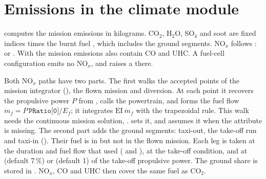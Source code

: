\documentclass[a4paper,11pt]{article}
\newcommand{\EI}[1]{\mathrm{EI}_{\mathrm{#1}}}
\begin{document}
\section{Emissions in the climate module}\label{sec:em-climate}

 computes the mission emissions in kilograms.
CO$_2$, H$_2$O, SO$_4$ and soot are fixed indices times the burnt fuel , which
includes the ground segments. NO$_x$ follows :
 or . With  the mission emissions also
contain CO and UHC. A fuel-cell configuration emits no NO$_x$, and  raises a
 there.

Both NO$_x$ paths have two parts. The first walks the accepted points of the mission integrator
(), the flown mission and diversion. At each point it recovers the
propulsive power $P$ from , calls the powertrain, and forms the fuel flow
$\dot m_f = P\,\texttt{PRatio[0]}/E_f$; it integrates $\EI{}\,\dot m_f$ with the trapezoidal
rule. This walk needs the continuous mission solution, .
 sets it, and  assumes it when the attribute is
missing. The second part adds the ground segments: taxi-out, the take-off run and taxi-in
(). Their fuel is in  but not in the flown
mission. Each leg is taken at the duration and fuel flow that 
used ( and ), at the take-off condition, and at
 (default 7\,\%) or  (default 1) of the
take-off propulsive power. The ground share is stored in .
NO$_x$, CO and UHC then cover the same fuel as CO$_2$.
\end{document}
